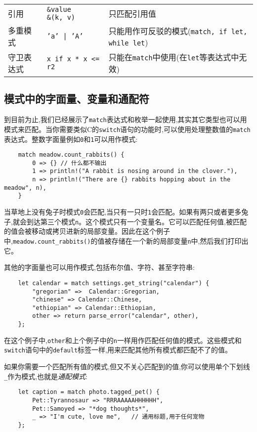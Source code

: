\begin{table}[htbp]
\begin{tabular}{p{}p{}p{}}
        \rowcolor{tablecolor}
        引用    & \makecell[l]{\texttt{\&value} \\ \texttt{\&(k, v)}}   & 只匹配引用值 \\
        多重模式    & \texttt{'a' | 'A'}    & 只能用作可反驳的模式(\texttt{match, if let, while let}) \\
        \rowcolor{tablecolor}
        守卫表达式  & \texttt{x if x * x <= r2} & 只能在\texttt{match}中使用(在\texttt{let}等表达式中无效) \\
    \end{tabular}
\end{table}

\subsection{模式中的字面量、变量和通配符}
到目前为止,我们已经展示了\texttt{match}表达式和枚举一起使用,其实其它类型也可以用模式来匹配。当你需要类似C的\texttt{switch}语句的功能时,可以使用处理整数值的\texttt{match}表达式。整数字面量例如\texttt{0}和\texttt{1}可以用作模式:
\begin{verbatim}
    match meadow.count_rabbits() {
        0 => {} // 什么都不输出
        1 => println!("A rabbit is nosing around in the clover."),
        n => println!("There are {} rabbits hopping about in the meadow", n),
    }
\end{verbatim}

当草地上没有兔子时模式\texttt{0}会匹配,当只有一只时\texttt{1}会匹配。如果有两只或者更多兔子,就会到达第三个模式\texttt{n}。这个模式只有一个变量名。它可以匹配任何值,被匹配的值会被移动或拷贝进新的局部变量。因此在这个例子中,\texttt{meadow.count\_rabbits()}的值被存储在一个新的局部变量\texttt{n}中,然后我们打印出它。

其他的字面量也可以用作模式,包括布尔值、字符、甚至字符串:
\begin{verbatim}
    let calendar = match settings.get_string("calendar") {
        "gregorian" =>  Calendar::Gregorian,
        "chinese" => Calendar::Chinese,
        "ethiopian" => Calendar::Ethiopian,
        other => return parse_error("calendar", other),
    };
\end{verbatim}

在这个例子中,\texttt{other}和上个例子中的\texttt{n}一样用作匹配任何值的模式。这些模式和\texttt{switch}语句中的\texttt{default}标签一样,用来匹配其他所有模式都匹配不了的值。

如果你需要一个匹配所有值的模式,但又不关心匹配到的值,你可以使用单个下划线\texttt{\_}作为模式,也就是\emph{通配模式}:
\begin{verbatim}
    let caption = match photo.tagged_pet() {
        Pet::Tyrannosaur => "RRRAAAAAHHHHHH",
        Pet::Samoyed => "*dog thoughts*",
        _ => "I'm cute, love me",   // 通用标题,用于任何宠物
    };
\end{verbatim}

